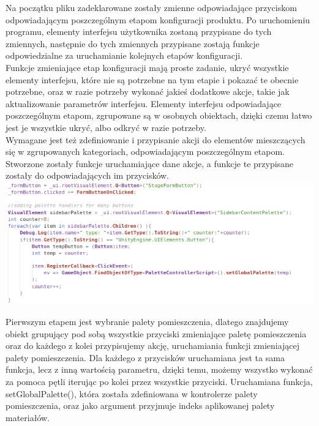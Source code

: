 \documentclass{article} %
\begin{document}
            Na początku pliku zadeklarowane zostały zmienne odpowiadające przyciskom odpowiadającym poszczególnym etapom konfiguracji produktu. Po uruchomieniu programu, elementy interfejsu użytkownika zostaną przypisane do tych zmiennych, następnie do tych zmiennych przypisane zostają funkcje odpowiedzialne za uruchamianie kolejnych etapów konfiguracji.
            \\
            
            Funkcje zmieniające etap konfiguracji mają proste zadanie, ukryć wszystkie elementy interfejsu, które nie są potrzebne na tym etapie i pokazać te obecnie potrzebne, oraz w razie potrzeby wykonać jakieś dodatkowe akcje, takie jak aktualizowanie parametrów interfejsu. Elementy interfejsu odpowiadające poszczególnym etapom, zgrupowane są w osobnych obiektach, dzięki czemu łatwo jest je wszystkie ukryć, albo odkryć w razie potrzeby.
            \\
            
            Wymagane jest też zdefiniowanie i przypisanie akcji do elementów mieszczących się w zgrupowanych kategoriach, odpowiadającym poszczególnym etapom. Stworzone zostały funkcje uruchamiające dane akcje, a funkcje te przypisane zostały do odpowiadających im przycisków. 
            \\
            
            \includegraphics[bb=0 0 691 275,scale=0.7,keepaspectratio=true]{images/screenshots/code/code_003.png}
            
            Pierwszym etapem jest wybranie palety pomieszczenia, dlatego znajdujemy obiekt grupujący pod sobą wszystkie przyciski zmieniające paletę pomieszczenia oraz do każdego z kolei przypisujemy akcję, uruchamiania funkcji zmieniającej palety pomieszczenia. Dla każdego z przycisków uruchamiana jest ta sama funkcja, lecz z inną wartością parametru, dzięki temu, możemy wszystko wykonać za pomoca pętli iterując po kolei przez wszystkie przyciski. Uruchamiana funkcja, setGlobalPalette(), która została zdefiniowana w kontrolerze palety pomieszczenia, oraz jako argument przyjmuje indeks aplikowanej palety materiałów.
            \\
            
\end{document}
